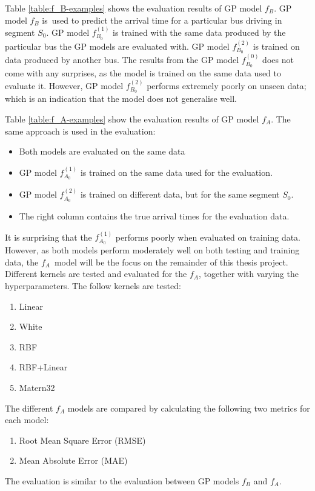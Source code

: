 Table \ref{table:f_B-examples} shows the evaluation results of GP model $f_B$.
GP model $f_B$ is used to predict the arrival time for a particular bus driving in segment $S_0$.
GP model $f^{(1)}_{B_0}$ is trained with the same data produced by the particular bus the GP models are evaluated with.
GP model $f^{(2)}_{B_0}$ is trained on data produced by another bus.
The results from the GP model $f^{(0)}_{B_0}$ does not come with any surprises, as the model is trained on the same data used to evaluate it.
However, GP model $f^{(2)}_{B_0}$ performs extremely poorly on unseen data; which is an indication that the model does not generalise well.

Table \ref{table:f_A-examples} show the evaluation results of GP model $f_A$.
The same approach is used in the evaluation:
\begin{itemize}
    \item Both models are evaluated on the same data
    \item GP model $f^{(1)}_{A_0}$ is trained on the same data used for the evaluation.
    \item GP model $f^{(2)}_{A_0}$ is trained on different data, but for the same segment $S_0$.
    \item The right column contains the true arrival times for the evaluation data.
\end{itemize}

It is surprising that the $f^{(1)}_{A_0}$ performs poorly when evaluated on training data.
However, as both models perform moderately well on both testing and training data, the $f_A$ model will be the focus on the remainder of this thesis project.
Different kernels are tested and evaluated for the $f_A$, together with varying the hyperparameters.
The follow kernels are tested:
\begin{enumerate}
    \item Linear 
    \item White
    \item RBF
    \item RBF+Linear
    \item Matern32
\end{enumerate}
The different $f_A$ models are compared by calculating the following two metrics for each model:
\begin{enumerate}
    \item Root Mean Square Error (RMSE)
    \item Mean Absolute Error (MAE)
\end{enumerate}
The evaluation is similar to the evaluation between GP models $f_B$ and $f_A$.

